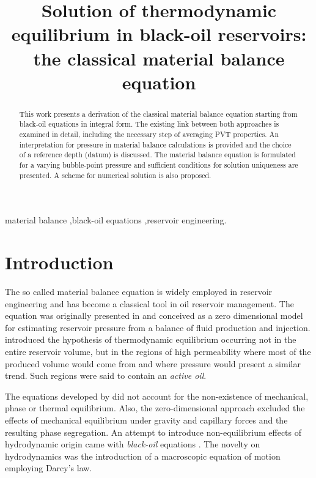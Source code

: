 \documentclass[authoryear,preprint,review,12pt]{elsarticle}
\begin{document}
\begin{frontmatter}
\title{Solution of thermodynamic equilibrium in black-oil reservoirs: the classical material balance equation}


\begin{abstract}
This work presents a derivation of the classical material balance equation starting from black-oil equations in integral form. The existing link between both approaches is examined in detail, including the necessary step of averaging PVT properties. An interpretation for pressure in material balance calculations is provided and the choice of a reference depth (datum) is discussed. The material balance equation is formulated for a varying bubble-point pressure and sufficient conditions for solution uniqueness are presented. A scheme for numerical solution is also proposed.
\end{abstract}

\begin{keyword}
material balance \sep black-oil equations \sep reservoir engineering.
\end{keyword}
\end{frontmatter}

\section{Introduction}
The so called material balance equation is widely employed in reservoir engineering and has become a classical tool in oil reservoir management. The equation was originally presented in \cite{schilthuis1936active} and conceived as a zero dimensional model for estimating reservoir pressure from a balance of fluid production and injection. \cite{schilthuis1936active} introduced the hypothesis of thermodynamic equilibrium occurring not in the entire reservoir volume, but in the regions of high permeability where most of the produced volume would come from and where pressure would present a similar trend. Such regions were said to contain an \textit{active oil}.

The equations developed by \cite{schilthuis1936active} did not account for the non-existence of mechanical, phase or thermal equilibrium. Also, the zero-dimensional approach excluded the effects of mechanical equilibrium under gravity and capillary forces and the resulting phase segregation. An attempt to introduce non-equilibrium effects of hydrodynamic origin came with \textit{black-oil} equations \citep{aziz1979petroleum,blackoil}. The novelty on hydrodynamics was the introduction of a macroscopic equation of motion employing Darcy's law.
\end{document}
